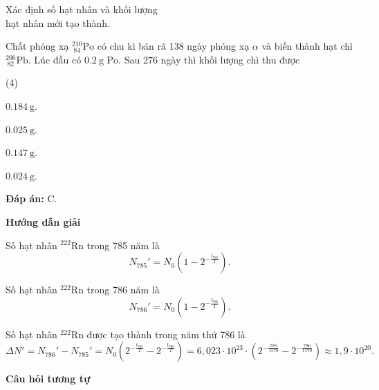 \begin{dang}{Xác định số hạt nhân và khối lượng\\ hạt nhân mới tạo thành.}
{Chất phóng xạ $^{210}_{\ 84}\text{Po}$ có chu kì bán rã 138 ngày phóng xạ $\alpha$ và biến thành hạt chì $^{206}_{\ 82}\text{Pb}$. Lúc đầu có $\SI{0,2}{\gram}$ $\text{Po}$. Sau 276 ngày thì khối lượng chì thu được
	\begin{mcq}(4)
		\item $\SI{0,184}{\gram}$.
		\item $\SI{0,025}{\gram}$.
		\item $\SI{0,147}{\gram}$.
		\item $\SI{0,024}{\gram}$.
	\end{mcq}
	
	\textbf{Đáp án:} C.}
	
	{
	\begin{center}
		\textbf{Hướng dẫn giải}
	\end{center}
	
	Số hạt nhân $^{222}\text{Rn}$ trong 785 năm là
	\begin{equation*}
	N_{785}'= N_0\left( 1-2^{-\frac{t_{785}}{T}}\right).
	\end{equation*}
	
	Số hạt nhân $^{222}\text{Rn}$ trong 786 năm là
	\begin{equation*}
	N_{786}'= N_0\left( 1-2^{-\frac{t_{786}}{T}}\right).
	\end{equation*}
	
	Số hạt nhân $^{222}\text{Rn}$ được tạo thành trong năm thứ 786 là
	\begin{equation*}
	\Delta N'= N_{786}'-N_{785}' =  N_0\left(2^{-\frac{t_{785}}{T}}-2^{-\frac{t_{786}}{T}}\right)=6,023\cdot10^{23}\cdot\left(2^{-\frac{785}{1570}}-2^{-\frac{786}{1570}}\right)\approx 1,9\cdot10^{20}.
	\end{equation*}
	
	\begin{center}
		\textbf{Câu hỏi tương tự}
	\end{center}
	
}
\end{dang}
